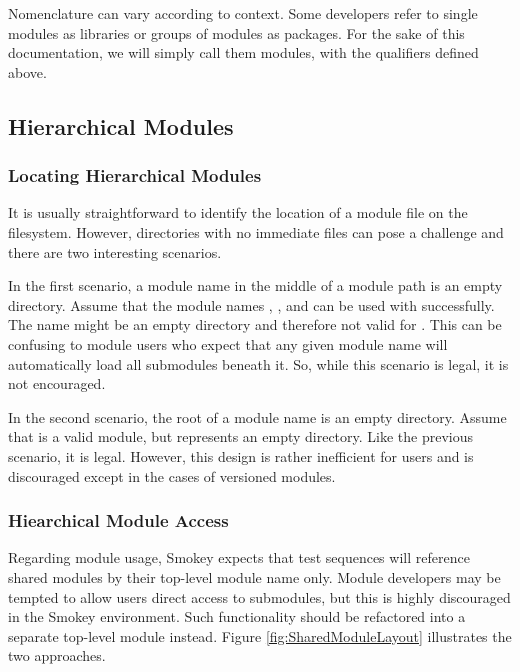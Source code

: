 Nomenclature can vary according to context.  Some developers refer to single
modules as libraries or groups of modules as packages.  For the sake of this
documentation, we will simply call them modules, with the qualifiers defined
above.

\subsection{Hierarchical Modules}
\label{sec:HierarchicalModules}

\subsubsection{Locating Hierarchical Modules}

It is usually straightforward to identify the location of a module file on the
filesystem.  However, directories with no immediate files can pose a challenge
and there are two interesting scenarios.

In the first scenario, a module name in the middle of a module path is an empty
directory.  Assume that the module names , , and
 can be used with  successfully.  The name
 might be an empty directory and therefore not valid for
.  This can be confusing to module users who expect that any
given module name will automatically load all submodules beneath it.  So, while
this scenario is legal, it is not encouraged.

In the second scenario, the root of a module name is an empty directory.
Assume that  is a valid module, but  represents an
empty directory.  Like the previous scenario, it is legal.  However, this
design is rather inefficient for users and is discouraged except in the cases
of versioned modules.

\subsubsection{Hiearchical Module Access}

Regarding module usage, Smokey expects that test sequences will reference
shared modules by their top-level module name only.  Module developers may be
tempted to allow users direct access to submodules, but this is highly
discouraged in the Smokey environment.  Such functionality should be refactored
into a separate top-level module instead.  Figure \ref{fig:SharedModuleLayout}
illustrates the two approaches.


